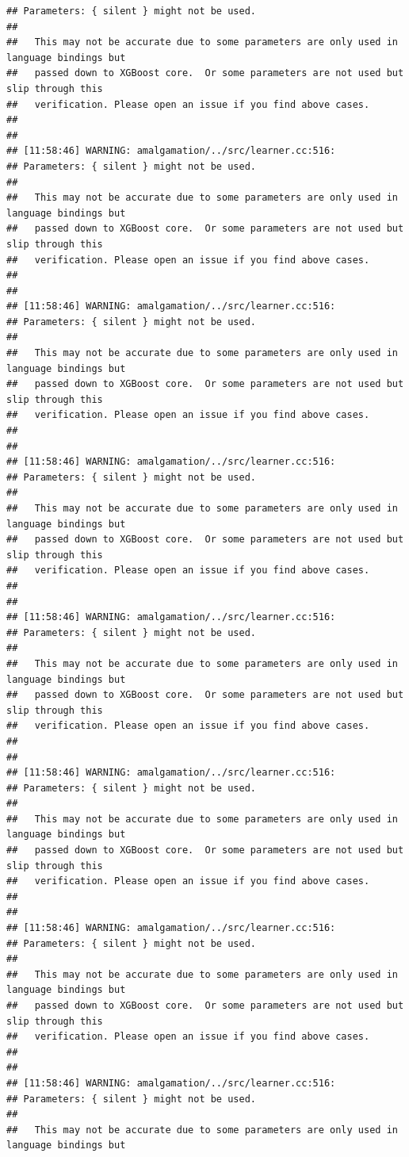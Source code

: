 \documentclass[AMS,STIX2COL]{WileyNJD-v2}\usepackage[]{graphicx}\usepackage[]{color}
\makeatletter
\newenvironment{kframe}{%
 \def\at@end@of@kframe{}%
 \ifinner\ifhmode%
  \def\at@end@of@kframe{\end{minipage}}%
  \begin{minipage}{\columnwidth}%
 \fi\fi%
 \def\FrameCommand##1{\hskip\@totalleftmargin \hskip-\fboxsep
 \colorbox{shadecolor}{##1}\hskip-\fboxsep
     \hskip-\linewidth \hskip-\@totalleftmargin \hskip\columnwidth}%
 \MakeFramed {\advance\hsize-\width
   \@totalleftmargin\z@ \linewidth\hsize
   \@setminipage}}%
 {\par\unskip\endMakeFramed%
 \at@end@of@kframe}
\newenvironment{knitrout}{}{} %
\makeatother
\begin{document}
\begin{knitrout}
\begin{kframe}
\begin{verbatim}
## Parameters: { silent } might not be used.
## 
##   This may not be accurate due to some parameters are only used in language bindings but
##   passed down to XGBoost core.  Or some parameters are not used but slip through this
##   verification. Please open an issue if you find above cases.
## 
## 
## [11:58:46] WARNING: amalgamation/../src/learner.cc:516: 
## Parameters: { silent } might not be used.
## 
##   This may not be accurate due to some parameters are only used in language bindings but
##   passed down to XGBoost core.  Or some parameters are not used but slip through this
##   verification. Please open an issue if you find above cases.
## 
## 
## [11:58:46] WARNING: amalgamation/../src/learner.cc:516: 
## Parameters: { silent } might not be used.
## 
##   This may not be accurate due to some parameters are only used in language bindings but
##   passed down to XGBoost core.  Or some parameters are not used but slip through this
##   verification. Please open an issue if you find above cases.
## 
## 
## [11:58:46] WARNING: amalgamation/../src/learner.cc:516: 
## Parameters: { silent } might not be used.
## 
##   This may not be accurate due to some parameters are only used in language bindings but
##   passed down to XGBoost core.  Or some parameters are not used but slip through this
##   verification. Please open an issue if you find above cases.
## 
## 
## [11:58:46] WARNING: amalgamation/../src/learner.cc:516: 
## Parameters: { silent } might not be used.
## 
##   This may not be accurate due to some parameters are only used in language bindings but
##   passed down to XGBoost core.  Or some parameters are not used but slip through this
##   verification. Please open an issue if you find above cases.
## 
## 
## [11:58:46] WARNING: amalgamation/../src/learner.cc:516: 
## Parameters: { silent } might not be used.
## 
##   This may not be accurate due to some parameters are only used in language bindings but
##   passed down to XGBoost core.  Or some parameters are not used but slip through this
##   verification. Please open an issue if you find above cases.
## 
## 
## [11:58:46] WARNING: amalgamation/../src/learner.cc:516: 
## Parameters: { silent } might not be used.
## 
##   This may not be accurate due to some parameters are only used in language bindings but
##   passed down to XGBoost core.  Or some parameters are not used but slip through this
##   verification. Please open an issue if you find above cases.
## 
## 
## [11:58:46] WARNING: amalgamation/../src/learner.cc:516: 
## Parameters: { silent } might not be used.
## 
##   This may not be accurate due to some parameters are only used in language bindings but

\end{verbatim}
\end{kframe}
\end{knitrout}
\end{document}
